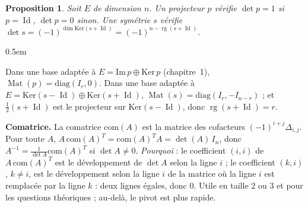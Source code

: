 \documentclass[a4paper,11pt]{article}
\makeatletter
\numberwithin{equation}{section}
\numberwithin{figure}{section}
\numberwithin{table}{section}
\theoremstyle{enonce}
\newtheorem{proposition}[definition]{Proposition}
\theoremstyle{exemple}
\theoremstyle{remarque}
\renewcommand{\proofname}{Démonstration}
\renewenvironment{proof}[1][\proofname]{\par\pushQED{\qed}\normalfont
  \topsep0.5em\relax\trivlist\item[\hskip\labelsep\sffamily\itshape\color{Gris}#1.]\ignorespaces}
  {\popQED\endtrivlist\@endpefalse}
\newcommand{\rg}{\operatorname{rg}}
\newcommand{\Mat}{\operatorname{Mat}}
\newcommand{\Id}{\operatorname{Id}}
\makeatother
\begin{document}
\begin{proposition}\label{prop:proj-sym}
Soit $E$ de dimension $n$. Un projecteur $p$ vérifie $\det p=1$ si $p=\Id$, $\det p=0$ sinon. Une symétrie $s$ vérifie
$\det s=(-1)^{\dim\mathrm{Ker}(s+\Id)}=(-1)^{n-\rg(s+\Id)}$.
\end{proposition}

\begin{proof}
Dans une base adaptée à $E=\mathrm{Im}\,p\oplus\mathrm{Ker}\,p$ (chapitre~1), $\Mat(p)=\mathrm{diag}(I_r,0)$. Dans une base adaptée à
$E=\mathrm{Ker}(s-\Id)\oplus\mathrm{Ker}(s+\Id)$, $\Mat(s)=\mathrm{diag}(I_r,-I_{n-r})$ ; et $\frac12(s+\Id)$ est le
projecteur sur $\mathrm{Ker}(s-\Id)$, donc $\rg(s+\Id)=r$.
\end{proof}

\begin{horsprogramme}\label{hp:comatrice}
\textbf{Comatrice.} La comatrice $\mathrm{com}(A)$ est la matrice des cofacteurs $(-1)^{i+j}\Delta_{i,j}$. Pour toute $A$,
$A\,\mathrm{com}(A)^T=\mathrm{com}(A)^TA=\det(A)\,I_n$, donc $A^{-1}=\frac1{\det A}\mathrm{com}(A)^T$ si $\det A\neq0$.
\emph{Pourquoi} : le coefficient $(i,i)$ de $A\,\mathrm{com}(A)^T$ est le développement de $\det A$ selon la ligne $i$ ; le
coefficient $(k,i)$, $k\neq i$, est le développement selon la ligne $i$ de la matrice où la ligne $i$ est remplacée par la
ligne $k$ : deux lignes égales, donc $0$. Utile en taille $2$ ou $3$ et pour les questions théoriques ; au-delà, le pivot
est plus rapide.
\end{horsprogramme}
\end{document}
